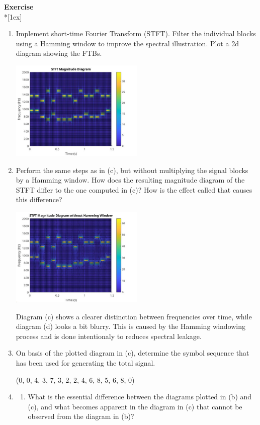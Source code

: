 \documentclass[12pt,a4paper,austrian]{article}
\newcounter{theaufgabe}\setcounter{theaufgabe}{1}
\newenvironment{aufgabe}[1]%
  {\bigskip\par\noindent\begin{nopagebreak}
   \textsf{\textbf{Exercise \arabic{theaufgabe}}}\quad
      \textsf{\textit{#1}}\\*[1ex]%
\stepcounter{theaufgabe}\hspace{2ex}\end{nopagebreak}}
  {\par\pagebreak[2]}
\begin{document}
\begin{aufgabe}{}
\begin{enumerate}
    \pagebreak

    \item Implement short-time Fourier Transform (STFT). Filter the individual blocks using a Hamming window to improve the spectral
    illustration. Plot a 2d diagram showing the FTBs.

    \includegraphics[width=0.5\textwidth]{../Ex04_c.jpg}

    \item Perform the same steps as in (c), but without multiplying the signal blocks by a Hamming window. 
    How does the resulting magnitude diagram of the STFT differ to the one computed in (c)? 
    How is the effect called that causes this difference?

    \includegraphics[width=0.5\textwidth]{../Ex04_d.jpg}

    Diagram (c) shows a clearer distinction between frequencies over time, while diagram (d) looks a bit blurry. 
    This is caused by the Hamming windowing process and is done intentionaly to reduces spectral leakage.

    \item On basis of the plotted diagram in (c), determine the symbol sequence that has been used
    for generating the total signal.

    \smallskip

    (0, 0, 4, 3, 7, 3, 2, 2, 4, 6, 8, 5, 6, 8, 0)

    \item
      \begin{enumerate}
        \item What is the essential difference between the diagrams plotted in (b) and (c), and what
        becomes apparent in the diagram in (c) that cannot be observed from the diagram in (b)?


\end{enumerate}
\end{enumerate}
\end{aufgabe}
\end{document}
